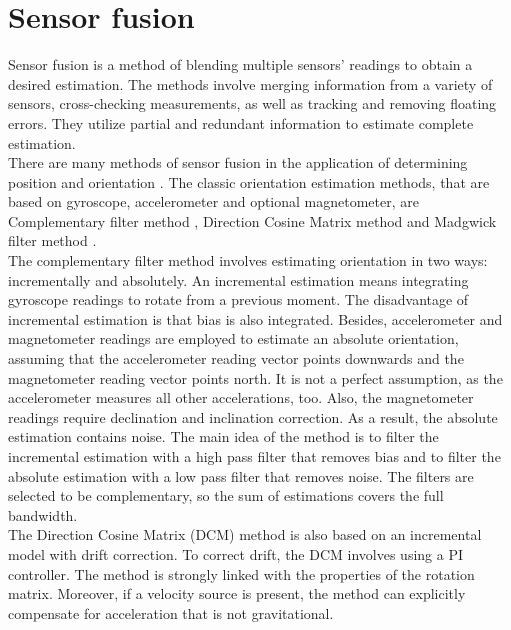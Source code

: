\chapter{Sensor fusion}

Sensor fusion is a method of blending multiple sensors’ readings to obtain a desired estimation. The methods involve merging information from a variety of sensors, cross-checking measurements, as well as tracking and removing floating errors. They utilize partial and redundant information to estimate complete estimation.\\

There are many methods of sensor fusion in the application of determining position and orientation \cite{uav}. The classic orientation estimation methods, that are based on gyroscope, accelerometer and optional magnetometer, are Complementary filter method \cite{complementary}, Direction Cosine Matrix method \cite{dcm} and Madgwick filter method \cite{madgwick}. \\

The complementary filter method involves estimating orientation in two ways: incrementally and absolutely. An incremental estimation means integrating gyroscope readings to rotate from a previous moment. The disadvantage of incremental estimation is that bias is also integrated. Besides, accelerometer and magnetometer readings are employed to estimate an absolute orientation, assuming that the accelerometer reading vector points downwards and the magnetometer reading vector points north. It is not a perfect assumption, as the accelerometer measures all other accelerations, too. Also, the magnetometer readings require declination and inclination correction. As a result, the absolute estimation contains noise. The main idea of the method is to filter the incremental estimation with a high pass filter that removes bias and to filter the absolute estimation with a low pass filter that removes noise. The filters are selected to be complementary, so the sum of estimations covers the full bandwidth.\\

The Direction Cosine Matrix (DCM) method is also based on an incremental model with drift correction. To correct drift, the DCM involves using a PI controller. The method is strongly linked with the properties of the rotation matrix. Moreover, if a velocity source is present, the method can explicitly compensate for acceleration that is not gravitational.\\


